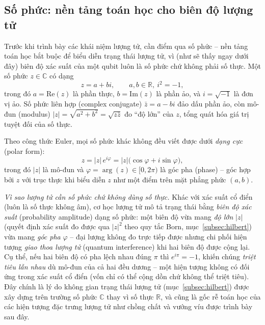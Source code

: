 \subsection{Số phức: nền tảng toán học cho biên độ lượng tử}
\label{subsec:complex}
Trước khi trình bày các khái niệm lượng tử, cần điểm qua số phức -- nền tảng toán học bắt buộc để biểu diễn trạng thái lượng tử, vì (như sẽ thấy ngay dưới đây) biên độ xác suất của một qubit luôn là số phức chứ không phải số thực. Một số phức $z\in\mathbb{C}$ có dạng
\begin{equation}
    z = a + bi, \qquad a, b\in\mathbb{R},\ i^2=-1,
\end{equation}
trong đó $a=\mathrm{Re}(z)$ là phần thực, $b=\mathrm{Im}(z)$ là phần ảo, và $i=\sqrt{-1}$ là đơn vị ảo. Số phức liên hợp (complex conjugate) $\bar{z}=a-bi$ đảo dấu phần ảo, còn mô-đun (modulus) $|z|=\sqrt{a^2+b^2}=\sqrt{z\bar{z}}$ đo ``độ lớn'' của $z$, tổng quát hóa giá trị tuyệt đối của số thực.

Theo công thức Euler, mọi số phức khác không đều viết được dưới \emph{dạng cực} (polar form):
\begin{equation}
    z = |z|\,e^{i\varphi} = |z|\big(\cos\varphi + i\sin\varphi\big),
\end{equation}
trong đó $|z|$ là mô-đun và $\varphi=\arg(z)\in[0,2\pi)$ là góc pha (phase) -- góc hợp bởi $z$ với trục thực khi biểu diễn $z$ như một điểm trên mặt phẳng phức $(a,b)$.

\emph{Vì sao lượng tử cần số phức chứ không dùng số thực.} Khác với xác suất cổ điển (luôn là số thực không âm), cơ học lượng tử mô tả trạng thái bằng \emph{biên độ xác suất} (probability amplitude) dạng số phức: một biên độ vừa mang \emph{độ lớn} $|z|$ (quyết định xác suất đo được qua $|z|^2$ theo quy tắc Born, mục~\ref{subsec:hilbert}) vừa mang \emph{góc pha} $\varphi$ -- đại lượng không đo trực tiếp được nhưng chi phối hiện tượng \emph{giao thoa lượng tử} (quantum interference) khi hai biên độ được cộng lại. Cụ thể, nếu hai biên độ có pha lệch nhau đúng $\pi$ thì $e^{i\pi}=-1$, khiến chúng \emph{triệt tiêu lẫn nhau} dù mô-đun của cả hai đều dương -- một hiện tượng không có đối ứng trong xác suất cổ điển (vốn chỉ có thể cộng dồn chứ không thể triệt tiêu). Đây chính là lý do không gian trạng thái lượng tử (mục~\ref{subsec:hilbert}) được xây dựng trên trường số phức $\mathbb{C}$ thay vì số thực $\mathbb{R}$, và cũng là gốc rễ toán học của các hiện tượng đặc trưng lượng tử như chồng chất và vướng víu được trình bày sau đây.

